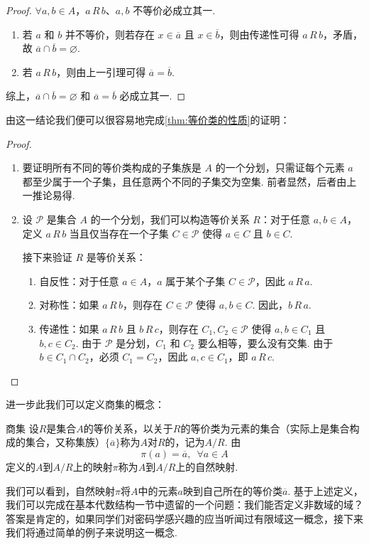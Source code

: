 \begin{proof}
$\forall a,b \in A$，$a \,R\, b$、$a,b$ 不等价必成立其一.
\begin{enumerate}
    \item 若 $a$ 和 $b$ 并不等价，则若存在 $x \in \overline{a}$ 且 $x \in \overline{b}$，则由传递性可得 $a \,R\, b$，矛盾，故 $\overline{a}\cap\overline{b}=\varnothing$.
    \item 若 $a \,R\, b$，则由上一引理可得 $\overline{a}=\overline{b}$.
\end{enumerate}
综上，$\overline{a}\cap\overline{b}=\varnothing$ 和 $\overline{a}=\overline{b}$ 必成立其一.
\end{proof}

由这一结论我们便可以很容易地完成\autoref{thm:等价类的性质}的证明：

\begin{proof}
\begin{enumerate}
    \item 要证明所有不同的等价类构成的子集族是 $A$ 的一个分划，只需证每个元素 $a$ 都至少属于一个子集，且任意两个不同的子集交为空集. 前者显然，后者由上一推论易得.
    \item 设 $ \mathcal{P} $ 是集合 $ A $ 的一个分划，我们可以构造等价关系 $ R $：对于任意 $ a, b \in A $，定义 $ a \,R\, b $ 当且仅当存在一个子集 $ C \in \mathcal{P} $ 使得 $ a \in C $ 且 $ b \in C $.

    接下来验证 $R$ 是等价关系：
    \begin{enumerate}
        \item 自反性：对于任意 $ a \in A $，$ a $ 属于某个子集 $ C \in \mathcal{P} $，因此 $ a \,R\, a $.
        \item 对称性：如果 $ a \,R\, b $，则存在 $ C \in \mathcal{P} $ 使得 $ a, b \in C $. 因此，$ b \,R\, a $.
        \item 传递性：如果 $ a \,R\, b $ 且 $ b \,R\, c $，则存在 $ C_1, C_2 \in \mathcal{P} $ 使得 $ a, b \in C_1 $ 且 $ b, c \in C_2 $. 由于 $ \mathcal{P} $ 是分划，$ C_1 $ 和 $ C_2 $ 要么相等，要么没有交集. 由于 $ b \in C_1 \cap C_2 $，必须 $ C_1 = C_2 $，因此 $ a, c \in C_1 $，即 $ a \,R\, c $.
    \end{enumerate}
\end{enumerate}
\end{proof}

进一步此我们可以定义商集的概念：
\begin{definition}{商集}{} 
    设$R$是集合$A$的等价关系，以关于$R$的等价类为元素的集合（实际上是集合构成的集合，又称集族）$\{\overline{a}\}$称为$A$对$R$的，记为$A/R$. 由
    \[\pi(a) = \overline{a}, \enspace \forall a\in A\]
    定义的$A$到$A/R$上的映射$\pi$称为$A$到$A/R$上的自然映射.
\end{definition}
我们可以看到，自然映射$\pi$将$A$中的元素$a$映到自己所在的等价类$\overline{a}$. 基于上述定义，我们可以完成在基本代数结构一节中遗留的一个问题：我们能否定义非数域的域？答案是肯定的，如果同学们对密码学感兴趣的应当听闻过有限域这一概念，接下来我们将通过简单的例子来说明这一概念.

